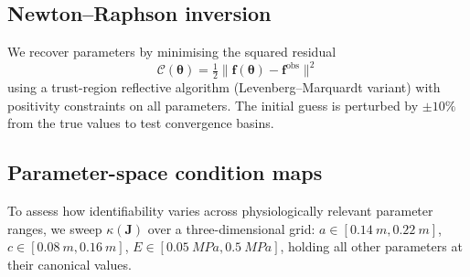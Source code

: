 \subsection{Newton--Raphson inversion}

We recover parameters by minimising the squared residual
\begin{equation}
  \mathcal{C}(\boldsymbol{\theta})
  = \tfrac{1}{2}
    \lVert \mathbf{f}(\boldsymbol{\theta}) - \mathbf{f}^\text{obs} \rVert^2
\end{equation}
using a trust-region reflective algorithm (Levenberg--Marquardt variant) with
positivity constraints on all parameters.  The initial guess is perturbed by
$\pm 10\%$ from the true values to test convergence basins.

\subsection{Parameter-space condition maps}

To assess how identifiability varies across physiologically relevant
parameter ranges, we sweep $\kappa(\mathbf{J})$ over a three-dimensional
grid: $a \in [\SI{0.14}{m}, \SI{0.22}{m}]$,
$c \in [\SI{0.08}{m}, \SI{0.16}{m}]$,
$E \in [\SI{0.05}{MPa}, \SI{0.5}{MPa}]$, holding all other parameters at
their canonical values.
